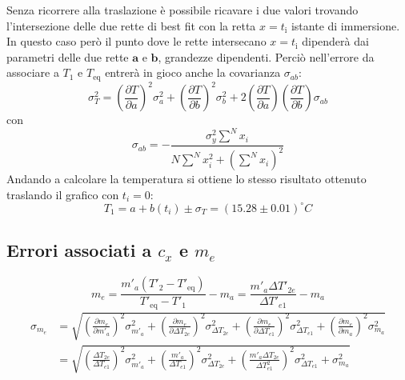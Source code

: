 \documentclass{article}
\begin{document}
	Senza ricorrere alla traslazione è possibile ricavare i due valori trovando l'intersezione delle due rette di best fit con la retta \(x=t_{\text{i}}\) istante di immersione. In questo caso però il punto dove le rette intersecano \(x=t_{\text{i}}\) dipenderà dai parametri delle due rette  \(\boldsymbol{a}\) e \(\boldsymbol{b}\), grandezze dipendenti. Perciò nell'errore da associare a \(T_{1}\) e \(T_{\text{eq}}\) entrerà in gioco anche la covarianza \(\sigma_{ab}\):
	\[ 
	\sigma_T^2 = \left(\frac{\partial T}{\partial a}\right)^2 \sigma_a^2 + \left(\frac{\partial T}{\partial b}\right)^2 \sigma_b^2 + 2\left(\frac{\partial T}{\partial a}\right)\left(\frac{\partial T}{\partial b}\right) \sigma_{ab}
	\]
	con
	\[
	\sigma_{ab} = -\frac{\sigma_y^2\sum^N x_i}{N\sum^Nx_i^2 + (\sum^N x_i)^2}
	\]
	Andando a calcolare la temperatura si ottiene lo stesso risultato ottenuto traslando il grafico con \(t_i = 0\):
	\[
	T_{1} = a + b(t_i) \pm \sigma_T = (15.28 \pm 0.01)^\circ C
	\]
	
	
	\subsection{Errori associati a \(c_{x}\) e \(m_{e}\)} 
	\[ 
	m_{e} = \frac{m'_{a}\left(T'_{2} - T'_{\text{eq}}\right)}{T'_{\text{eq}} - T'_{1}} - m_{a} =  \frac{m'_{a}\Delta T'_{2e}}{\Delta T'_{e1}} - m_{a}
	\] \label{sigma me}
	\begin{align*}
		\sigma_{m_e} &= \sqrt{\left(\frac{\partial m_{e}}{\partial m'_{a}}\right)^2\sigma_{m'_{a}}^2 + \left(\frac{\partial m_{e}}{\partial\Delta T_{2e}}\right)^2\sigma_{\Delta T_{2e}}^2 + \left(\frac{\partial m_{e}}{\partial\Delta T_{e1}}\right)^2\sigma_{\Delta T_{e1}}^2 + \left(\frac{\partial m_{e}}{\partial m_{a}}\right)^2\sigma^2_{m_{a}}} \\
		&= \sqrt{\left(\frac{\Delta T_{2e}}{\Delta T_{e1}}\right)^2\sigma_{m'_{a}}^2 + \left(\frac{m'_{a}}{\Delta T_{e1}}\right)^2\sigma^2_{\Delta T_{2e}} + \left(\frac{m'_{a}\Delta T_{2e}}{\Delta T_{e1}^2}\right)^2\sigma^2_{\Delta T_{e1}}+\sigma^2_{m_{a}}}
	\end{align*}
	\vspace{1cm}
	
\end{document}
